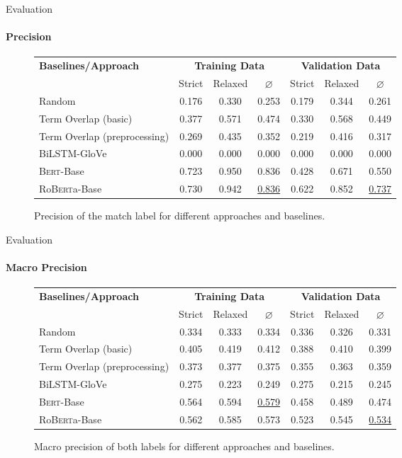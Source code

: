 \documentclass[english,handout]{mlutalk}
\newcommand{\BiLSTM}{\mbox{BiLSTM}\xspace}
\newcommand{\Bert}{\textsc{Bert}\xspace}
\newcommand{\BertBase}{\Bert-Base\xspace}
\newcommand{\Roberta}{\mbox{Ro\textsc{Bert}a}\xspace}
\newcommand{\RobertaBase}{\Roberta-Base\xspace}
\begin{document}
\begin{frame}{Evaluation}
  \framesubtitle{Precision}
  \begin{figure}
    \centering
    \caption{Precision of the match label for different approaches and baselines.}
    \scriptsize
    \begin{tabular}{lcccccc}
      \toprule
      \textbf{Baselines/Approach} & \multicolumn{3}{c}{\textbf{Training Data}} & \multicolumn{3}{c}{\textbf{Validation Data}} \\
      \cmidrule(r{0.5em}){2-4} \cmidrule(l{0.5em}){5-7}
      & Strict & Relaxed & \(\varnothing\) & Strict & Relaxed & \(\varnothing\) \\
      \midrule
      Random 
      & 0.176 & 0.330 & 0.253 & 0.179 & 0.344 & 0.261 \\
      Term Overlap (basic)
      & 0.377 & 0.571 & 0.474 & 0.330 & 0.568 & 0.449 \\
      Term Overlap (preprocessing)
      & 0.269 & 0.435 & 0.352 & 0.219 & 0.416 & 0.317 \\
      \midrule
      \BiLSTM-GloVe
      & 0.000 & 0.000 & 0.000 & 0.000 & 0.000 & 0.000 \\
      \BertBase
      & 0.723 & 0.950 & 0.836 & 0.428 & 0.671 & 0.550 \\
      \RobertaBase
      & 0.730 & 0.942 & \underline{0.836} & 0.622 & 0.852 & \underline{0.737} \\
      \bottomrule
    \end{tabular}
  \end{figure}
\end{frame}

\begin{frame}{Evaluation}
  \framesubtitle{Macro Precision}
  \begin{figure}
    \centering
    \caption{Macro precision of both labels for different approaches and baselines.}
    \scriptsize
    \begin{tabular}{lcccccc}
      \toprule
      \textbf{Baselines/Approach} & \multicolumn{3}{c}{\textbf{Training Data}} & \multicolumn{3}{c}{\textbf{Validation Data}} \\
      \cmidrule(r{0.5em}){2-4} \cmidrule(l{0.5em}){5-7}
      & Strict & Relaxed & \(\varnothing\) & Strict & Relaxed & \(\varnothing\) \\
      \midrule
      Random 
      & 0.334 & 0.333 & 0.334 & 0.336 & 0.326 & 0.331 \\
      Term Overlap (basic)
      & 0.405 & 0.419 & 0.412 & 0.388 & 0.410 & 0.399 \\
      Term Overlap (preprocessing)
      & 0.373 & 0.377 & 0.375 & 0.355 & 0.363 & 0.359 \\
      \midrule
      \BiLSTM-GloVe
      & 0.275 & 0.223 & 0.249 & 0.275 & 0.215 & 0.245 \\
      \BertBase
      & 0.564 & 0.594 & \underline{0.579} & 0.458 & 0.489 & 0.474 \\
      \RobertaBase
      & 0.562 & 0.585 & 0.573 & 0.523 & 0.545 & \underline{0.534} \\
      \bottomrule
    \end{tabular}
  \end{figure}
\end{frame}
\end{document}
